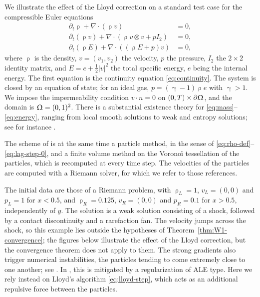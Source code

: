 \documentclass[letterpaper,11pt,twoside]{article}
\numberwithin{figure}{section}
\numberwithin{table}{section}
\theoremstyle{cpamplain}
\theoremstyle{cpamdefinition}
\let\gamma\upgamma
\let\rho\uprho
\let\Omega\Upomega
\numberwithin{equation}{section}
\begin{document}
We illustrate the effect of the Lloyd correction on a standard test case for the compressible Euler equations
\begin{align}
\partial_t \rho + \nabla \cdot(\rho v) &= 0, \label{eq:mass}\\
\partial_t(\rho v) + \nabla \cdot(\rho v\otimes v + p I_2) &= 0, \label{eq:mom}\\
\partial_t\left(\rho E\right) + \nabla \cdot\left(\left(\rho E + p\right)v\right) &= 0, \label{eq:energy}
\end{align}
where $\rho$ is the density, $v=(v_1,v_2)$ the velocity, $p$ the pressure, $I_2$ the $2\times2$ identity matrix, and $E=e+\frac12|v|^2$ the total specific energy, $e$ being the internal energy.
The first equation is the continuity equation \eqref{eq:continuity}.
The system is closed by an equation of state; for an ideal gas, $p=(\gamma-1)\rho e$ with $\gamma>1$.
We impose the impermeability condition $v\cdot n=0$ on $(0,T)\times\partial\Omega$, and the domain is $\Omega=(0,1)^2$.
There is a substantial existence theory for \eqref{eq:mass}--\eqref{eq:energy}, ranging from local smooth solutions to weak and entropy solutions; see for instance \cite{Majda1984,Dafermos2016}.

The scheme of \cite{despres2024,desprem} is at the same time a particle method, in the sense of \eqref{eq:rho-def}--\eqref{eq:lag-step-0}, and a finite volume method on the Vorono\"i tessellation of the particles, which is recomputed at every time step.
The velocities of the particles are computed with a Riemann solver, for which we refer to those references.

The initial data are those of a Riemann problem, with $\rho_L=1$, $v_L=(0,0)$ and $p_L=1$ for $x<0.5$, and $\rho_R=0.125$, $v_R=(0,0)$ and $p_R=0.1$ for $x>0.5$, independently of $y$.
The solution is a weak solution consisting of a shock, followed by a contact discontinuity and a rarefaction fan.
The velocity jumps across the shock, so this example lies outside the hypotheses of Theorem~\ref{thm:W1-convergence}; the figures below illustrate the effect of the Lloyd correction, but the convergence theorem does not apply to them.
The strong gradients also trigger numerical instabilities, the particles tending to come extremely close to one another; see \cite{despres2024,desprem}.
In \cite{loulou,kincl}, this is mitigated by a regularization of ALE type.
Here we rely instead on Lloyd's algorithm \eqref{eq:lloyd-step}, which acts as an additional repulsive force between the particles.
\end{document}
